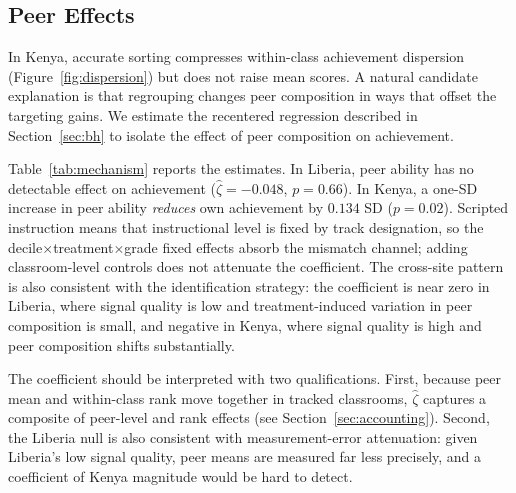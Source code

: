 \documentclass[11pt]{article}
\begin{document}
\subsection{Peer Effects}

In Kenya, accurate sorting compresses within-class achievement dispersion (Figure~\ref{fig:dispersion}) but does not raise mean scores. A natural candidate explanation is that regrouping changes peer composition in ways that offset the targeting gains. We estimate the recentered regression described in Section~\ref{sec:bh} to isolate the effect of peer composition on achievement.

Table~\ref{tab:mechanism} reports the estimates. In Liberia, peer ability has no detectable effect on achievement ($\hat{\zeta} = -0.048$, $p = 0.66$). In Kenya, a one-SD increase in peer ability \emph{reduces} own achievement by $0.134$ SD ($p = 0.02$). Scripted instruction means that instructional level is fixed by track designation, so the decile$\times$treatment$\times$grade fixed effects absorb the mismatch channel; adding classroom-level controls does not attenuate the coefficient. The cross-site pattern is also consistent with the identification strategy: the coefficient is near zero in Liberia, where signal quality is low and treatment-induced variation in peer composition is small, and negative in Kenya, where signal quality is high and peer composition shifts substantially.

The coefficient should be interpreted with two qualifications. First, because peer mean and within-class rank move together in tracked classrooms, $\hat{\zeta}$ captures a composite of peer-level and rank effects (see Section~\ref{sec:accounting}). Second, the Liberia null is also consistent with measurement-error attenuation: given Liberia's low signal quality, peer means are measured far less precisely, and a coefficient of Kenya magnitude would be hard to detect.
\end{document}
